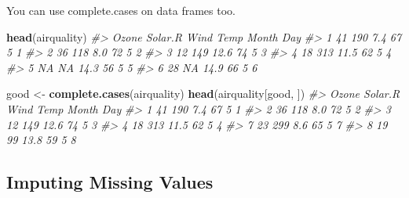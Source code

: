 \documentclass[
]{book}
\newenvironment{Shaded}{\begin{snugshade}}{\end{snugshade}}
\newcommand{\AttributeTok}[1]{\textcolor[rgb]{0.13,0.29,0.53}{#1}}
\newcommand{\CommentTok}[1]{\textcolor[rgb]{0.56,0.35,0.01}{\textit{#1}}}
\newcommand{\ConstantTok}[1]{\textcolor[rgb]{0.56,0.35,0.01}{#1}}
\newcommand{\FunctionTok}[1]{\textcolor[rgb]{0.13,0.29,0.53}{\textbf{#1}}}
\newcommand{\NormalTok}[1]{#1}
\newcommand{\OtherTok}[1]{\textcolor[rgb]{0.56,0.35,0.01}{#1}}
\newcommand{\SpecialCharTok}[1]{\textcolor[rgb]{0.81,0.36,0.00}{\textbf{#1}}}
\begin{document}
You can use complete.cases on data frames too.

\begin{Shaded}
\begin{Highlighting}[]
\FunctionTok{head}\NormalTok{(airquality)}
\CommentTok{\#\textgreater{}   Ozone Solar.R Wind Temp Month Day}
\CommentTok{\#\textgreater{} 1    41     190  7.4   67     5   1}
\CommentTok{\#\textgreater{} 2    36     118  8.0   72     5   2}
\CommentTok{\#\textgreater{} 3    12     149 12.6   74     5   3}
\CommentTok{\#\textgreater{} 4    18     313 11.5   62     5   4}
\CommentTok{\#\textgreater{} 5    NA      NA 14.3   56     5   5}
\CommentTok{\#\textgreater{} 6    28      NA 14.9   66     5   6}
\end{Highlighting}
\end{Shaded}

\begin{Shaded}
\begin{Highlighting}[]
\NormalTok{good }\OtherTok{\textless{}{-}} \FunctionTok{complete.cases}\NormalTok{(airquality)}
\FunctionTok{head}\NormalTok{(airquality[good, ])}
\CommentTok{\#\textgreater{}   Ozone Solar.R Wind Temp Month Day}
\CommentTok{\#\textgreater{} 1    41     190  7.4   67     5   1}
\CommentTok{\#\textgreater{} 2    36     118  8.0   72     5   2}
\CommentTok{\#\textgreater{} 3    12     149 12.6   74     5   3}
\CommentTok{\#\textgreater{} 4    18     313 11.5   62     5   4}
\CommentTok{\#\textgreater{} 7    23     299  8.6   65     5   7}
\CommentTok{\#\textgreater{} 8    19      99 13.8   59     5   8}
\end{Highlighting}
\end{Shaded}

\begin{Shaded}
\end{Shaded}

\subsection*{Imputing Missing Values}\label{imputing-missing-values}
\end{document}
